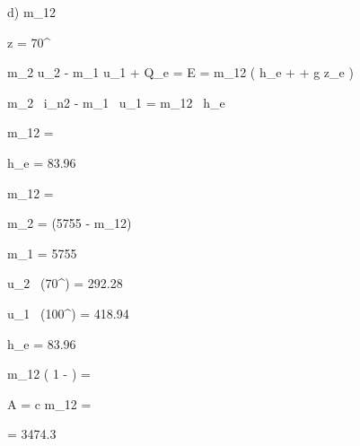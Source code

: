 d) \quad {} \quad \Delta m_{12}

 \quad z = 70^\circ

\Rightarrow {} 


m_2 u_2 - m_1 u_1 + \Delta Q_e = \Delta E = \Delta m_{12} \left( h_e +  + g z_e \right)

 \quad {}

m_2 \, i_{n2} - m_1 \, u_1 = \Delta m_{12} \, h_e

\Delta m_{12} = 

h_e = 83.96 \, 

\Delta m_{12} = 

m_2 = (5755 - \Delta m_{12})

m_1 = 5755 \, 

u_2 \, (70^\circ) = 292.28 \, 

u_1 \, (100^\circ) = 418.94 \, 

h_e = 83.96

\Delta m_{12} \left( 1 -  \right) = 

 \quad A = c \quad \Delta m_{12} = 

= 3474.3 \, 